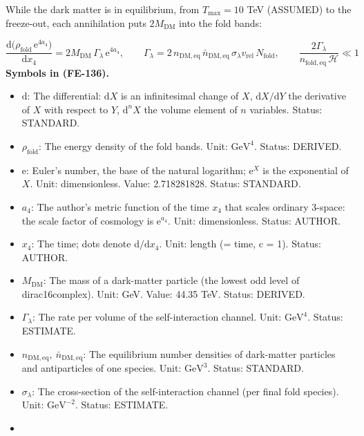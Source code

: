 \documentclass[
  10pt,
]{article}
\providecommand{\tightlist}{%
  \setlength{\itemsep}{0pt}\setlength{\parskip}{0pt}}
\begin{document}
While the dark matter is in equilibrium, from \(T_{\mathrm{max}} = 10\)
TeV (ASSUMED) to the freeze-out, each annihilation puts
\(2M_{\mathrm{DM}}\) into the fold bands:

\[
\frac{\mathrm{d}\big(\rho_{\mathrm{fold}}\,\mathrm{e}^{4a_4}\big)}{\mathrm{d}x_4} =
 2M_{\mathrm{DM}}\,\Gamma_\lambda\,\mathrm{e}^{4a_4},\qquad
\Gamma_\lambda = 2\,n_{\mathrm{DM,eq}}\,\bar n_{\mathrm{DM,eq}}\,\sigma_\lambda
 v_{\mathrm{rel}}\,N_{\mathrm{fold}},\qquad
\frac{2\Gamma_\lambda}{n_{\mathrm{fold,eq}}\,\mathcal{H}} \ll 1 \tag{FE-136}
\] \textbf{Symbols in (FE-136).}

\begin{itemize}
\tightlist
\item
  \(\mathrm{d}\): The differential: \(\mathrm{d}X\) is an infinitesimal
  change of \(X\), \(\mathrm{d}X/\mathrm{d}Y\) the derivative of \(X\)
  with respect to \(Y\), \(\mathrm{d}^nX\) the volume element of \(n\)
  variables. Status: STANDARD.
\item
  \(\rho_{\mathrm{fold}}\): The energy density of the fold bands. Unit:
  \(\mathrm{GeV}^{4}\). Status: DERIVED.
\item
  \(\mathrm{e}\): Euler's number, the base of the natural logarithm;
  \(\mathrm{e}^{X}\) is the exponential of \(X\). Unit: dimensionless.
  Value: 2.718281828. Status: STANDARD.
\item
  \(a_4\): The author's metric function of the time \(x_4\) that scales
  ordinary 3-space: the scale factor of cosmology is
  \(\mathrm{e}^{a_4}\). Unit: dimensionless. Status: AUTHOR.
\item
  \(x_4\): The time; dots denote \(\mathrm{d}/\mathrm{d}x_4\). Unit:
  length (= time, c = 1). Status: AUTHOR.
\item
  \(M_{\mathrm{DM}}\): The mass of a dark-matter particle (the lowest
  odd level of dirac16complex). Unit: GeV. Value: 44.35 TeV. Status:
  DERIVED.
\item
  \(\Gamma_\lambda\): The rate per volume of the self-interaction
  channel. Unit: \(\mathrm{GeV}^{4}\). Status: ESTIMATE.
\item
  \(n_{\mathrm{DM,eq}},\ \bar n_{\mathrm{DM,eq}}\): The equilibrium
  number densities of dark-matter particles and antiparticles of one
  species. Unit: \(\mathrm{GeV}^{3}\). Status: STANDARD.
\item
  \(\sigma_\lambda\): The cross-section of the self-interaction channel
  (per final fold species). Unit: \(\mathrm{GeV}^{-2}\). Status:
  ESTIMATE.
\item

\end{itemize}
\end{document}
